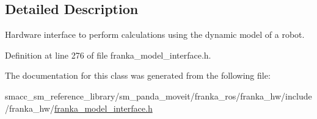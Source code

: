 \subsection{Detailed Description}
Hardware interface to perform calculations using the dynamic model of a robot. 

Definition at line 276 of file franka\+\_\+model\+\_\+interface.\+h.



The documentation for this class was generated from the following file\+:\begin{DoxyCompactItemize}
\item 
smacc\+\_\+sm\+\_\+reference\+\_\+library/sm\+\_\+panda\+\_\+moveit/franka\+\_\+ros/franka\+\_\+hw/include/franka\+\_\+hw/\hyperlink{franka__model__interface_8h}{franka\+\_\+model\+\_\+interface.\+h}\end{DoxyCompactItemize}
